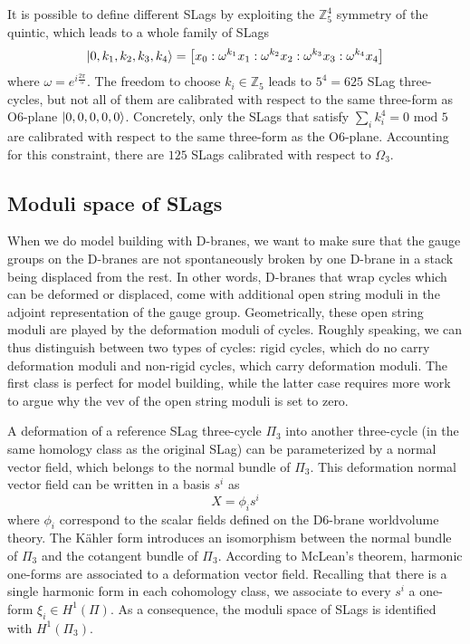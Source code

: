It is possible to define different SLags by exploiting the $\mathbb Z_5^4$ symmetry of the quintic,
which leads to a whole family of SLags
\begin{equation}
  \ket{0,k_1,k_2,k_3,k_4} = {\qty[x_0:\omega^{k_1} x_1:\omega^{k_2} x_2:\omega^{k_3} x_3:\omega^{k_4} x_4]}
\end{equation}
where $\omega=e^{i\frac{2\pi}{5}}$. 
The freedom to choose $k_i\in \mathbb Z_5$ leads to $5^4=625$ SLag three-cycles, but not all of them are calibrated
with respect to the same three-form as O$6$-plane $\ket{0,0,0,0,0}$.
%
Concretely, only the SLags that satisfy $\sum_{i} k_i^4=0 \text{ mod 5}$ are calibrated with respect to the same three-form as the O$6$-plane.
Accounting for this constraint, there are $125$ SLags calibrated with respect to $\Omega_3$.

\subsection{Moduli space of SLags}

When we do model building with D-branes, we want to make sure that the gauge groups on the D-branes are not spontaneously broken by one D-brane in a stack being displaced from the rest.
In other words, D-branes that wrap cycles which can be deformed or displaced, come with additional open string moduli in the adjoint representation of the gauge group.
Geometrically, these open string moduli are played by the deformation moduli of cycles.
Roughly speaking, we can thus distinguish between two types of cycles:
rigid cycles, which do no carry deformation moduli
and non-rigid cycles, which carry deformation moduli.
The first class is perfect for model building, while the latter case requires more work to argue why the vev of the open string moduli is set to zero.


A deformation of a reference SLag three-cycle $\Pi_3$ into another three-cycle (in the same homology class as the original SLag)  can be parameterized by a normal vector field, which belongs to the normal bundle of $\Pi_3$.  
This deformation normal vector field can be written in a basis $s^i$ as
\begin{equation}
  X=\phi_i s^i
\end{equation}
where $\phi_i$ correspond to the scalar fields defined on the D6-brane worldvolume theory.
The Kähler form introduces an isomorphism between the normal bundle of $\Pi_3$ and the cotangent bundle of $\Pi_3$.
According to McLean's theorem, harmonic one-forms are associated to a deformation vector field.
Recalling that there is a single harmonic form in each cohomology class, we associate to every $s^i$ a one-form $\xi_i\in H^1(\Pi)$.
As a consequence, the moduli space of SLags is identified with $H^1(\Pi_3)$.

